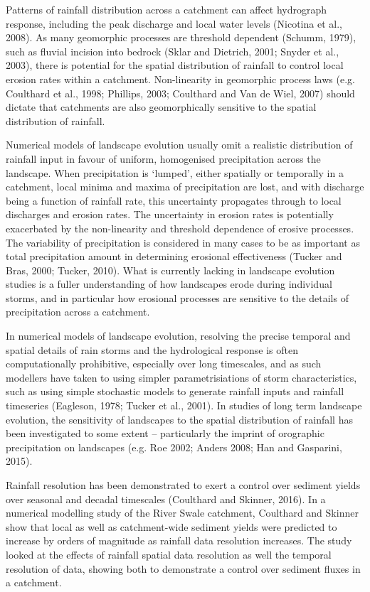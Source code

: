 Patterns of rainfall distribution across a catchment can affect hydrograph response, including the peak discharge and local water levels (Nicotina et al., 2008). As many geomorphic processes are threshold dependent (Schumm, 1979), such as fluvial incision into bedrock (Sklar and Dietrich, 2001; Snyder et al., 2003), there is potential for the spatial distribution of rainfall to control local erosion rates within a catchment. Non-linearity in geomorphic process laws (e.g. Coulthard et al., 1998; Phillips, 2003; Coulthard and Van de Wiel, 2007) should dictate that catchments are also geomorphically sensitive to the spatial distribution of rainfall. 

Numerical models of landscape evolution usually omit a realistic distribution of rainfall input in favour of uniform, homogenised precipitation across the landscape. When precipitation is `lumped', either spatially or temporally in a catchment, local minima and maxima of precipitation are lost, and with discharge being a function of rainfall rate, this uncertainty propagates through to local discharges and erosion rates. The uncertainty in erosion rates is potentially exacerbated by the non-linearity and threshold dependence of erosive processes. The variability of precipitation is considered in many cases to be as important as total precipitation amount in determining erosional effectiveness (Tucker and Bras, 2000; Tucker, 2010). What is currently lacking in landscape evolution studies is a fuller understanding of how landscapes erode during individual storms, and in particular how erosional processes are sensitive to the details of precipitation across a catchment. 

In numerical models of landscape evolution, resolving the precise temporal and spatial details of rain storms and the hydrological response is often computationally prohibitive, especially over long timescales, and as such modellers have taken to using simpler parametrisiations of storm characteristics, such as using simple stochastic models to generate rainfall inputs and rainfall timeseries (Eagleson, 1978; Tucker et al., 2001). In studies of long term landscape evolution, the sensitivity of landscapes to the spatial distribution of rainfall has been investigated to some extent -- particularly the imprint of orographic precipitation on landscapes (e.g. Roe 2002; Anders 2008; Han and Gasparini, 2015). 

Rainfall resolution has been demonstrated to exert a control over sediment yields over seasonal and decadal timescales (Coulthard and Skinner, 2016). In a numerical modelling study of the River Swale catchment, Coulthard and Skinner show that local as well as catchment-wide sediment yields were predicted to increase by orders of magnitude as rainfall data resolution increases. The study looked at the effects of rainfall spatial data resolution as well the temporal resolution of data, showing both to demonstrate a control over sediment fluxes in a catchment. 

